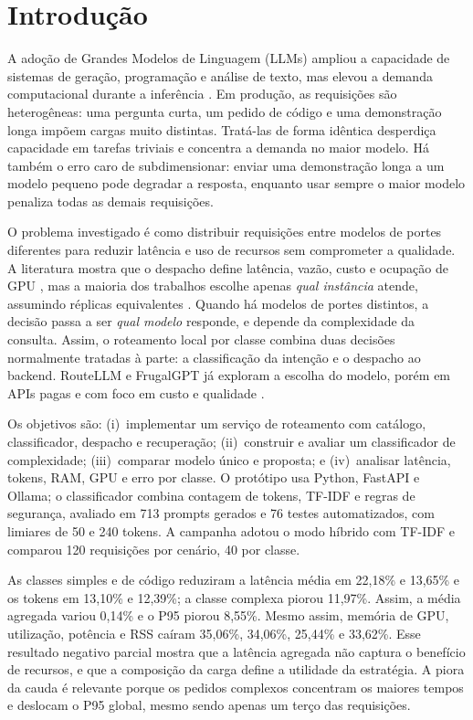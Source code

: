 \documentclass[12pt]{article}
\begin{document}
\section{Introdução}

A adoção de Grandes Modelos de Linguagem (LLMs) ampliou a capacidade de sistemas de geração, programação e análise de texto, mas elevou a demanda computacional durante a inferência \cite{article:llm_gpu,article:llumnix}. Em produção, as requisições são heterogêneas: uma pergunta curta, um pedido de código e uma demonstração longa impõem cargas muito distintas. Tratá-las de forma idêntica desperdiça capacidade em tarefas triviais e concentra a demanda no maior modelo. Há também o erro caro de subdimensionar: enviar uma demonstração longa a um modelo pequeno pode degradar a resposta, enquanto usar sempre o maior modelo penaliza todas as demais requisições.

O problema investigado é como distribuir requisições entre modelos de portes diferentes para reduzir latência e uso de recursos sem comprometer a qualidade. A literatura mostra que o despacho define latência, vazão, custo e ocupação de GPU \cite{article:llm_gpu,article:performance_lb}, mas a maioria dos trabalhos escolhe apenas \emph{qual instância} atende, assumindo réplicas equivalentes \cite{article:skywalker,article:dualmap}. Quando há modelos de portes distintos, a decisão passa a ser \emph{qual modelo} responde, e depende da complexidade da consulta. Assim, o roteamento local por classe combina duas decisões normalmente tratadas à parte: a classificação da intenção e o despacho ao backend. RouteLLM e FrugalGPT já exploram a escolha do modelo, porém em APIs pagas e com foco em custo e qualidade \cite{article:routellm,article:frugalgpt}.

Os objetivos são: (i)~implementar um serviço de roteamento com catálogo, classificador, despacho e recuperação; (ii)~construir e avaliar um classificador de complexidade; (iii)~comparar modelo único e proposta; e (iv)~analisar latência, tokens, RAM, GPU e erro por classe. O protótipo usa Python, FastAPI e Ollama; o classificador combina contagem de tokens, TF-IDF e regras de segurança, avaliado em 713 prompts gerados e 76 testes automatizados, com limiares de 50 e 240 tokens. A campanha adotou o modo híbrido com TF-IDF e comparou 120 requisições por cenário, 40 por classe.

As classes simples e de código reduziram a latência média em 22,18\% e 13,65\% e os tokens em 13,10\% e 12,39\%; a classe complexa piorou 11,97\%. Assim, a média agregada variou 0,14\% e o P95 piorou 8,55\%. Mesmo assim, memória de GPU, utilização, potência e RSS caíram 35,06\%, 34,06\%, 25,44\% e 33,62\%. Esse resultado negativo parcial mostra que a latência agregada não captura o benefício de recursos, e que a composição da carga define a utilidade da estratégia. A piora da cauda é relevante porque os pedidos complexos concentram os maiores tempos e deslocam o P95 global, mesmo sendo apenas um terço das requisições.
\end{document}

